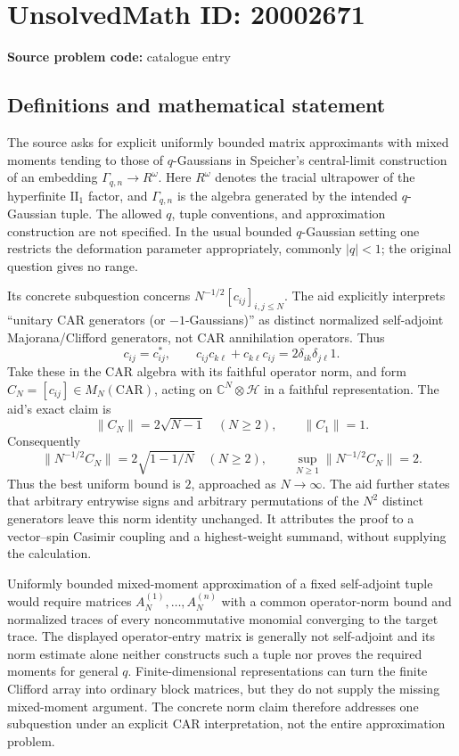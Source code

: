 \documentclass[11pt]{article}
\newcommand{\C}{\mathbb{C}}
\begin{document}
\section*{UnsolvedMath ID: 20002671}
\textbf{Source problem code:} catalogue entry
\subsection{Definitions and mathematical statement}
The source asks for explicit uniformly bounded matrix approximants with mixed moments tending to those of $q$-Gaussians in Speicher's central-limit construction of an embedding $\Gamma_{q,n}\to R^\omega$. Here $R^\omega$ denotes the tracial ultrapower of the hyperfinite $\mathrm{II}_1$ factor, and $\Gamma_{q,n}$ is the algebra generated by the intended $q$-Gaussian tuple. The allowed $q$, tuple conventions, and approximation construction are not specified. In the usual bounded $q$-Gaussian setting one restricts the deformation parameter appropriately, commonly $|q|<1$; the original question gives no range.

Its concrete subquestion concerns $N^{-1/2}[c_{ij}]_{i,j\le N}$. The aid explicitly interprets ``unitary CAR generators (or $-1$-Gaussians)'' as distinct normalized self-adjoint Majorana/Clifford generators, not CAR annihilation operators. Thus
\[
 c_{ij}=c_{ij}^*,\qquad
 c_{ij}c_{k\ell}+c_{k\ell}c_{ij}
 =2\delta_{ik}\delta_{j\ell}1.
\]
Take these in the CAR algebra with its faithful operator norm, and form $C_N=[c_{ij}]\in M_N(\mathrm{CAR})$, acting on $\C^N\otimes\mathcal H$ in a faithful representation. The aid's exact claim is
\[
 \|C_N\|=2\sqrt{N-1}\quad(N\ge2),\qquad \|C_1\|=1.
\]
Consequently
\[
 \|N^{-1/2}C_N\|=2\sqrt{1-1/N}\quad(N\ge2),\qquad
 \sup_{N\ge1}\|N^{-1/2}C_N\|=2.
\]
Thus the best uniform bound is $2$, approached as $N\to\infty$. The aid further states that arbitrary entrywise signs and arbitrary permutations of the $N^2$ distinct generators leave this norm identity unchanged. It attributes the proof to a vector--spin Casimir coupling and a highest-weight summand, without supplying the calculation.

Uniformly bounded mixed-moment approximation of a fixed self-adjoint tuple would require matrices $A_N^{(1)},\ldots,A_N^{(n)}$ with a common operator-norm bound and normalized traces of every noncommutative monomial converging to the target trace. The displayed operator-entry matrix is generally not self-adjoint and its norm estimate alone neither constructs such a tuple nor proves the required moments for general $q$. Finite-dimensional representations can turn the finite Clifford array into ordinary block matrices, but they do not supply the missing mixed-moment argument. The concrete norm claim therefore addresses one subquestion under an explicit CAR interpretation, not the entire approximation problem.
\end{document}
